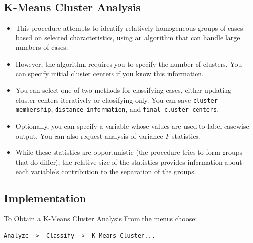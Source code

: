 \documentclass[a4paper,12pt]{article}
\begin{document}


\subsection*{K-Means Cluster Analysis}
\begin{itemize}
	\item This procedure attempts to identify relatively homogeneous groups of cases based on selected characteristics, using an algorithm that can handle large numbers of cases.
	\item However, the algorithm requires you to specify the number of clusters. You can specify initial cluster centers if you know this information. \item You can select one of two methods for classifying cases, either updating cluster centers iteratively or classifying only. You can save \texttt{cluster membership}, \texttt{distance information}, and \texttt{final cluster centers}. 
	\item Optionally, you can specify a variable whose values are used to label casewise output. You can also request analysis of variance $F$ statistics.
	\item  While these statistics are opportunistic (the procedure tries to form groups that do differ), the relative size of the statistics provides information about each variable's contribution to the separation of the groups.
	
\end{itemize}




\subsection*{Implementation}
To Obtain a K-Means Cluster Analysis
From the menus choose:
\begin{verbatim}
Analyze  >  Classify  >  K-Means Cluster...    
\end{verbatim}
\end{document}
